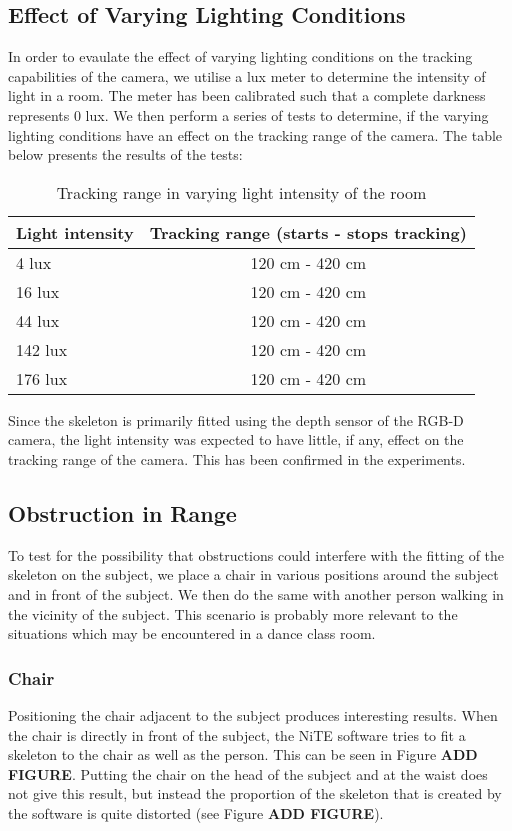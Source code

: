 \documentclass[10pt]{article}
\begin{document}
\subsection{Effect of Varying Lighting Conditions}
\noindent
In order to evaulate the effect of varying lighting conditions on the tracking capabilities of the camera, we utilise a lux meter to determine the intensity of light in a room. The meter has been calibrated such that a complete darkness represents 0 lux. We then perform a series of tests to determine, if the varying lighting conditions have an effect on the tracking range of the camera. The table below presents the results of the tests:
\begin{table}[h]
\center
\begin{tabular}{ | l | c |}
\hline
Light intensity & Tracking range (starts - stops tracking) \\
\hline
4 lux & 120 cm - 420 cm\\
16 lux & 120 cm - 420 cm\\
44 lux & 120 cm - 420 cm\\
142 lux & 120 cm - 420 cm\\
176 lux & 120 cm - 420 cm\\
\hline
\end{tabular}
\caption{Tracking range in varying light intensity of the room}
\label{cam_range_varying_light}
\end{table}

\noindent
Since the skeleton is primarily fitted using the depth sensor of the RGB-D camera, the light intensity was expected to have little, if any, effect on the tracking range of the camera. This has been confirmed in the experiments.


\subsection{Obstruction in Range}
\noindent
To test for the possibility that obstructions could interfere with the fitting of the skeleton on the subject, we place a chair in various positions around the subject and in front of the subject. We then do the same with another person walking in the vicinity of the subject. This scenario is probably more relevant to the situations which may be encountered in a dance class room.  
\subsubsection{Chair}
\noindent Positioning the chair adjacent to the subject produces interesting results. When the chair is directly in front of the subject, the NiTE software tries to fit a skeleton to the chair as well as the person. This can be seen in Figure \textbf{ADD FIGURE}. Putting the chair on the head of the subject and at the waist does not give this result, but instead the proportion of the skeleton that is created by the software is quite distorted (see Figure \textbf{ADD FIGURE}). 
\end{document}
